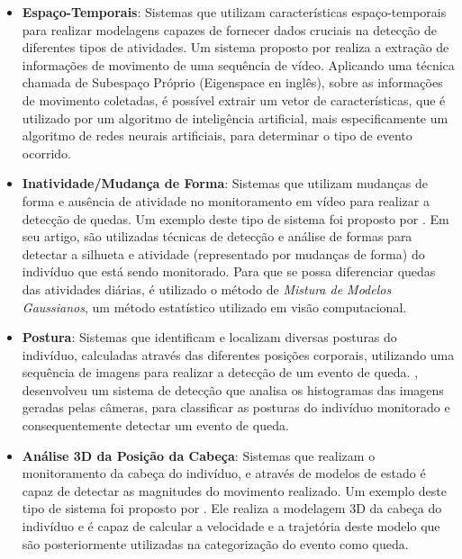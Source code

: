 \begin{itemize}
	\item{\textbf{Espaço-Temporais}: Sistemas que utilizam características espaço-temporais para realizar modelagens capazes de fornecer dados cruciais na detecção de diferentes tipos de atividades.  Um sistema proposto por \cite{foroughi2008eigenspace} realiza a extração de informações de movimento de uma sequência de vídeo. Aplicando uma técnica chamada de Subespaço Próprio (Eigenspace en inglês), sobre as informações de movimento coletadas, é possível extrair um vetor de características, que  é utilizado por um algoritmo de inteligência artificial, mais especificamente um algoritmo de redes neurais artificiais, para determinar o tipo de evento ocorrido. }
	
	\item{\textbf{Inatividade/Mudança de Forma}: Sistemas que utilizam mudanças de forma e ausência de atividade no monitoramento em vídeo para realizar a detecção de quedas. Um exemplo deste tipo de sistema foi proposto por \cite{rougier2011robust}. Em seu artigo, são utilizadas técnicas de detecção e análise de formas para detectar a silhueta e atividade (representado por mudanças de forma) do indivíduo que está sendo monitorado. Para que se possa diferenciar quedas das atividades diárias, é utilizado o método de \textit{Mistura de Modelos Gaussianos}, um método estatístico utilizado em visão computacional.}
	
	\item{\textbf{Postura}: Sistemas que identificam e localizam diversas posturas do indivíduo, calculadas através das diferentes posições corporais, utilizando uma sequência de imagens para realizar a detecção de um evento de queda. \cite{cucchiara2005probabilistic}, desenvolveu um sistema de detecção que analisa os histogramas das imagens geradas pelas câmeras, para classificar as posturas do indivíduo monitorado e consequentemente detectar um evento de queda.  }
	
	\item{\textbf{Análise 3D da Posição da Cabeça}: Sistemas que realizam o monitoramento da cabeça do indivíduo, e através de modelos de estado é capaz de detectar as magnitudes do movimento realizado. Um exemplo deste tipo de sistema foi proposto por \cite{rougier2005demo}. Ele realiza a modelagem 3D da cabeça do indivíduo e é capaz de calcular a velocidade e a trajetória deste modelo que são posteriormente utilizadas na categorização do evento como queda.}	
\end{itemize}

